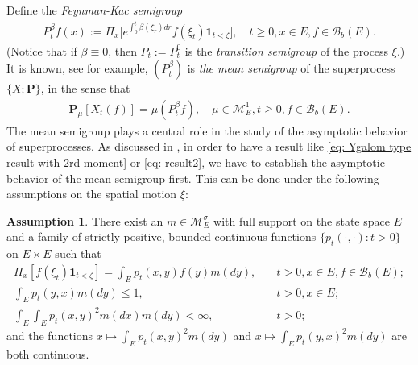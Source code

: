 \documentclass[UTF8]{pkuthss}
\theoremstyle{plain}
\theoremstyle{definition}
\newtheorem{asp}{Assumption}[chapter]
\numberwithin{equation}{section}
\begin{document}
	Define the \emph{Feynman-Kac semigroup}
\begin{align}
	P^\beta_tf(x)
	:= \Pi_x \big[e^{\int_0^{t} \beta(\xi_r)dr} f(\xi_t)\mathbf 1_{t<\zeta}\big],
	\quad t\geq 0, x\in E, f\in \mathscr B_b(E).
\end{align}
	(Notice that if $\beta \equiv 0$, then $P_t:= P^0_t$ is the \emph{transition semigroup} of the process $\xi$.)
	It is known, see \cite[Proposition 2.27]{Li2011MeasureValued} for example, $(P^\beta_t)$ is \emph{the mean semigroup} of the superprocess $\{X; \mathbf P\}$, in the sense that
\begin{align} \label{eq: Ygalom type result without 2rd moment}
	\mathbf P_\mu [X_t(f)]
	= \mu(P^\beta_t f),
	\quad \mu \in \mathcal M^1_E,
	t \geq 0,f \in \mathscr B_b(E).
\end{align}
    The  mean semigroup plays a central role in the study of the asymptotic behavior of superprocesses.
	As discussed in \cite{EvansPerkins1990Measurevalued}, in order to have a result like \eqref{eq: Ygalom type result with 2rd moment} or \eqref{eq: result2}, we have to establish the asymptotic behavior of the mean semigroup first.
	This can be done under the following assumptions on the spatial motion $\xi$:
\begin{asp} \label{asp: 1}
    There exist an $m \in \mathcal M_E^\sigma$ with full support on the state space $E$ and a family of strictly positive,
	bounded continuous functions $\{ p_t(\cdot,\cdot): t > 0 \}$ on $E \times E$ such that
\begin{align}
	\Pi_x[ f(\xi_t)\mathbf 1_{t < \zeta} ]
	= \int_E p_t(x,y) f(y) m(dy),
	&\quad t>0, x \in E,f \in \mathscr B_b(E);
	\\\int_E p_t(y,x)m(dy)
	\leq 1,	
	&\quad t>0,x\in E;
	\\\int_E \int_E p_t(x,y)^2 m(dx) m(dy)
	<\infty,
	&\quad t> 0;
\end{align}
	and the functions $x \mapsto \int_E p_t(x,y)^2 m(dy)$ and $x \mapsto \int_E p_t(y,x)^2 m(dy)$ are both continuous.
\end{asp}
\end{document}
